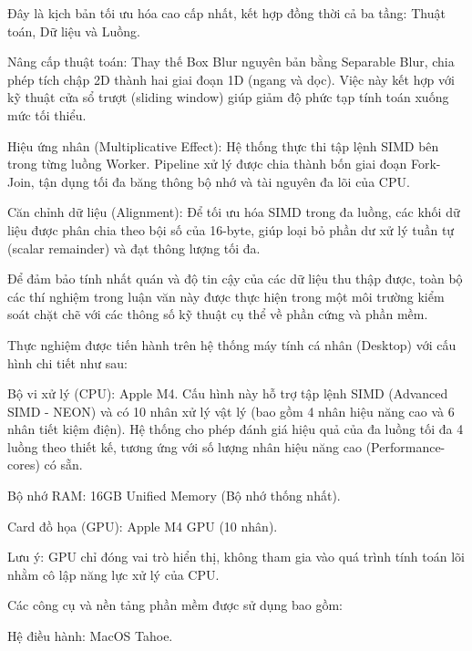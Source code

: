 
Đây là kịch bản tối ưu hóa cao cấp nhất, kết hợp đồng thời cả ba tầng: Thuật toán, Dữ liệu và Luồng.


Nâng cấp thuật toán: Thay thế Box Blur nguyên bản bằng Separable Blur, chia phép tích chập 2D thành hai giai đoạn 1D (ngang và dọc). Việc này kết hợp với kỹ thuật cửa sổ trượt (sliding window) giúp giảm độ phức tạp tính toán xuống mức tối thiểu.


Hiệu ứng nhân (Multiplicative Effect): Hệ thống thực thi tập lệnh SIMD bên trong từng luồng Worker. Pipeline xử lý được chia thành bốn giai đoạn Fork-Join, tận dụng tối đa băng thông bộ nhớ và tài nguyên đa lõi của CPU.


Căn chỉnh dữ liệu (Alignment): Để tối ưu hóa SIMD trong đa luồng, các khối dữ liệu được phân chia theo bội số của 16-byte, giúp loại bỏ phần dư xử lý tuần tự (scalar remainder) và đạt thông lượng tối đa.



Để đảm bảo tính nhất quán và độ tin cậy của các dữ liệu thu thập được, toàn bộ các thí nghiệm trong luận văn này được thực hiện trong một môi trường kiểm soát chặt chẽ với các thông số kỹ thuật cụ thể về phần cứng và phần mềm.



Thực nghiệm được tiến hành trên hệ thống máy tính cá nhân (Desktop) với cấu hình chi tiết như sau:


Bộ vi xử lý (CPU): Apple M4. Cấu hình này hỗ trợ tập lệnh SIMD (Advanced SIMD - NEON) và có 10 nhân xử lý vật lý (bao gồm 4 nhân hiệu năng cao và 6 nhân tiết kiệm điện). Hệ thống cho phép đánh giá hiệu quả của đa luồng tối đa 4 luồng theo thiết kế, tương ứng với số lượng nhân hiệu năng cao (Performance-cores) có sẵn.


Bộ nhớ RAM: 16GB Unified Memory (Bộ nhớ thống nhất).


Card đồ họa (GPU): Apple M4 GPU (10 nhân).


Lưu ý: GPU chỉ đóng vai trò hiển thị, không tham gia vào quá trình tính toán lõi nhằm cô lập năng lực xử lý của CPU.



Các công cụ và nền tảng phần mềm được sử dụng bao gồm:


Hệ điều hành: MacOS Tahoe.


